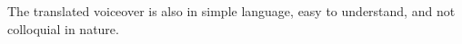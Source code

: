 \documentclass[preview]{standalone}
\begin{document}
\begin{flushleft}
\fontsize{20}{0}\selectfont The translated voiceover is also in simple language, easy to understand, and not colloquial in nature.
\end{flushleft}
\end{document}

